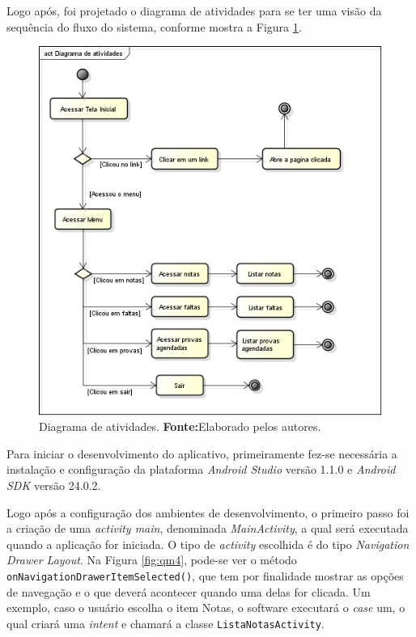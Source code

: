 	\par Logo após, foi projetado o diagrama de atividades para se ter uma visão
da sequência do fluxo do sistema, conforme mostra a Figura \ref{fig:qm3}.
		
		
		\begin{figure}[h!]
			\centerline{\includegraphics[scale=0.4]{./imagens/2_q_metodologico/qm3.png}}
			\caption[Diagrama de atividades]{Diagrama de atividades.
			 \textbf{Fonte:}Elaborado pelos autores.}
			\label{fig:qm3}
		\end{figure}
		
	
	\par Para iniciar o desenvolvimento do aplicativo, primeiramente fez-se
necessária a instalação e configuração da plataforma \textit{Android Studio}
versão 1.1.0 e \textit{Android SDK} versão 24.0.2.

	\par Logo após a configuração dos ambientes de desenvolvimento, o primeiro
passo foi a criação de uma \textit{activity main}, denominada
\textit{MainActivity}, a qual será executada quando a aplicação for iniciada. O
tipo de \textit{activity} escolhida é do tipo \textit{Navigation Drawer
Layout}. Na Figura \ref{fig:qm4}, pode-se ver o método
\texttt{onNavigationDrawerItemSelected()}, que tem por finalidade mostrar as
opções de navegação e o que deverá acontecer quando uma delas for clicada. Um
exemplo, caso o usuário escolha o item Notas, o software executará o
\textit{case} um, o qual criará uma \textit{intent} e chamará a classe
\texttt{ListaNotasActivity}.
	
